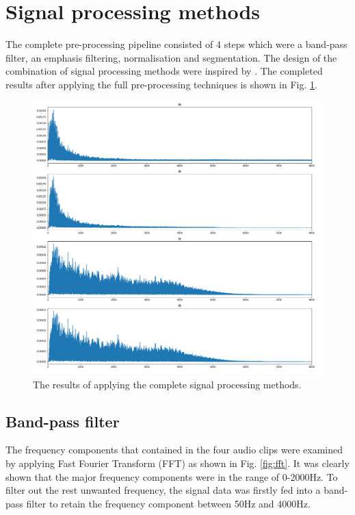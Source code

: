 \clearpage
\section{Signal processing methods}
The complete pre-processing pipeline consisted of 4 steps which were a band-pass filter, an emphasis filtering, normalisation and segmentation. The design of the combination of signal processing methods were inspired by \cite{Lei2014Content-basedFeatures}\cite{Niu2019AState}\cite{Ren2015Fine-grainedSmartphones}. The completed results after applying the full pre-processing techniques is shown in Fig. \ref{fig:fft_pipeline}.
\begin{figure}[h]
    \centerline{\includegraphics[scale=0.33]{figures/fft_pipeline.png}}
    \caption{The results of applying the complete signal processing methods.}
    \label{fig:fft_pipeline}
\end{figure}

\subsection{Band-pass filter}
The frequency components that contained in the four audio clips were  examined by applying Fast Fourier Transform (FFT) as shown in Fig. \ref{fig:fft}. It was clearly shown that the major frequency components were in the range of 0-2000Hz. To filter out the rest unwanted frequency, the signal data was firstly fed into a band-pass filter to retain the frequency component between 50Hz and 4000Hz. 

